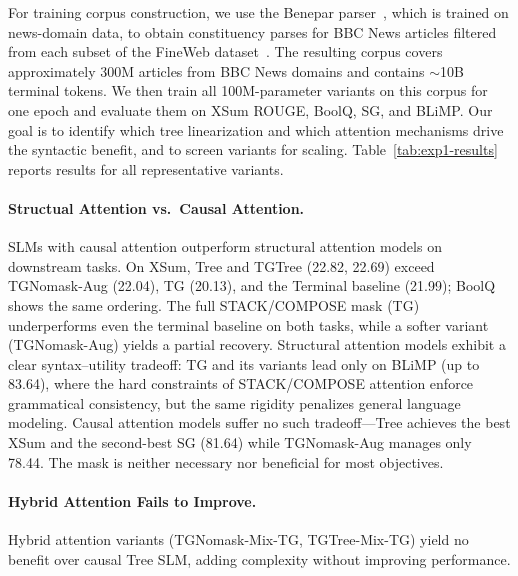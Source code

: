 \documentclass[11pt]{article}
\begin{document}
For training corpus construction, we use the Benepar parser~\cite{kitaev-klein-2018-constituency}, which is trained on news-domain data, to obtain constituency parses for BBC News articles filtered from each subset of the FineWeb dataset~\cite{penedo2024fineweb}. 
The resulting corpus covers approximately 300M articles from BBC News domains and contains $\sim$10B terminal tokens.
We then train all 100M-parameter variants on this corpus for one epoch and evaluate them on XSum ROUGE, BoolQ, SG, and BLiMP.
Our goal is to identify which tree linearization and which attention mechanisms drive the syntactic benefit, and to screen variants for scaling.
Table~\ref{tab:exp1-results} reports results for all representative variants.

\paragraph{Structual Attention vs.\ Causal Attention.}
SLMs with causal attention outperform structural attention models on downstream tasks.
On XSum, Tree and TGTree (22.82, 22.69) exceed TGNomask-Aug (22.04), TG (20.13), and the Terminal baseline (21.99); BoolQ shows the same ordering.
The full STACK/COMPOSE mask (TG) underperforms even the terminal baseline on both tasks, while a softer variant (TGNomask-Aug) yields a partial recovery.
Structural attention models exhibit a clear syntax--utility tradeoff: TG and its variants lead only on BLiMP (up to 83.64), where the hard constraints of STACK/COMPOSE attention enforce grammatical consistency, but the same rigidity penalizes general language modeling.
Causal attention models suffer no such tradeoff---Tree achieves the best XSum and the second-best SG (81.64) while TGNomask-Aug manages only 78.44.
The mask is neither necessary nor beneficial for most objectives. %

\paragraph{Hybrid Attention Fails to Improve.}
Hybrid attention variants (TGNomask-Mix-TG, TGTree-Mix-TG) yield no benefit over causal Tree SLM, adding complexity without improving performance.
\end{document}
